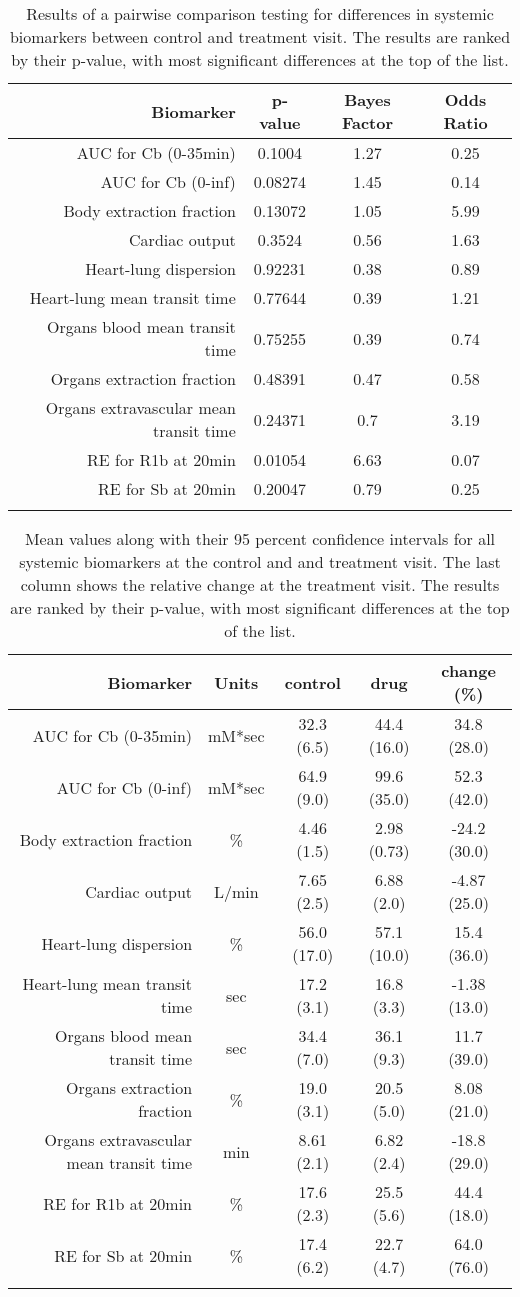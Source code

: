 \documentclass{epflreport}%
\begin{document}
%
\begin{longtable}{rccc}%
\hline%
Biomarker&p{-}value&Bayes Factor&Odds Ratio\\%
\hline%
AUC for Cb (0{-}35min)&0.1004&1.27&0.25\\%
AUC for Cb (0{-}inf)&0.08274&1.45&0.14\\%
Body extraction fraction&0.13072&1.05&5.99\\%
Cardiac output&0.3524&0.56&1.63\\%
Heart{-}lung dispersion&0.92231&0.38&0.89\\%
Heart{-}lung mean transit time&0.77644&0.39&1.21\\%
Organs blood mean transit time&0.75255&0.39&0.74\\%
Organs extraction fraction&0.48391&0.47&0.58\\%
Organs extravascular mean transit time&0.24371&0.7&3.19\\%
RE for R1b at 20min&0.01054&6.63&0.07\\%
RE for Sb at 20min&0.20047&0.79&0.25\\%
\hline%
\caption{Results of a pairwise comparison testing for differences in systemic biomarkers between control and treatment visit. The results are ranked by their p-value, with most significant differences at the top of the list.} \\%
\end{longtable}%
\begin{longtable}{rcccc}%
\hline%
Biomarker&Units&control&drug&change (\%)\\%
\hline%
AUC for Cb (0{-}35min)&mM*sec&32.3 (6.5) &44.4 (16.0) &34.8 (28.0) \\%
AUC for Cb (0{-}inf)&mM*sec&64.9 (9.0) &99.6 (35.0) &52.3 (42.0) \\%
Body extraction fraction&\%&4.46 (1.5) &2.98 (0.73) &{-}24.2 (30.0) \\%
Cardiac output&L/min&7.65 (2.5) &6.88 (2.0) &{-}4.87 (25.0) \\%
Heart{-}lung dispersion&\%&56.0 (17.0) &57.1 (10.0) &15.4 (36.0) \\%
Heart{-}lung mean transit time&sec&17.2 (3.1) &16.8 (3.3) &{-}1.38 (13.0) \\%
Organs blood mean transit time&sec&34.4 (7.0) &36.1 (9.3) &11.7 (39.0) \\%
Organs extraction fraction&\%&19.0 (3.1) &20.5 (5.0) &8.08 (21.0) \\%
Organs extravascular mean transit time&min&8.61 (2.1) &6.82 (2.4) &{-}18.8 (29.0) \\%
RE for R1b at 20min&\%&17.6 (2.3) &25.5 (5.6) &44.4 (18.0) \\%
RE for Sb at 20min&\%&17.4 (6.2) &22.7 (4.7) &64.0 (76.0) \\%
\hline%
\caption{Mean values along with their 95 percent confidence intervals for all systemic biomarkers at the control and and treatment visit. The last column shows the relative change at the treatment visit. The results are ranked by their p-value, with most significant differences at the top of the list.} \\%
\end{longtable}%
\clearpage%
\end{document}
